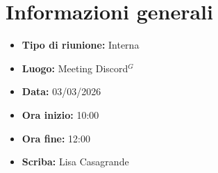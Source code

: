 \section{Informazioni generali}

\begin{itemize}
    \item \textbf{Tipo di riunione:} Interna
    \item \textbf{Luogo:} Meeting Discord$^G$
    \item \textbf{Data:} 03/03/2026
    \item \textbf{Ora inizio:} 10:00
    \item \textbf{Ora fine:} 12:00
    \item \textbf{Scriba:} Lisa Casagrande
\end{itemize}